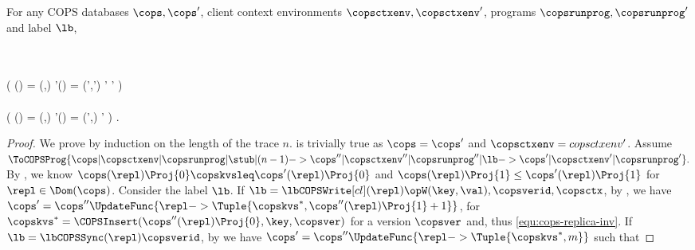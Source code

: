 \begin{toappendix}
\label{sec:proof-monotonic-cops-replca-client}
\begin{proposition}
\label{prop:cops-inv}
For any COPS databases \( \cops, \cops'\), client context environments \( \copsctxenv, \copsctxenv' \),
programs \( \copsrunprog, \copsrunprog' \) and label \( \lb \),
\begin{Formulae}
\begin{Formula}
    \\ \implies {} 
    \\ \left( \cops(\repl) = (\copskvs,\ts) \land
    \cops'(\repl) = (\copskvs',\ts') 
    \implies \copskvs \copskvsleq \copskvs'
    \land \ts \leq \ts'  \right)
    \\ {} \land {} 
    \\ \left( \copsctxenv(\cl) = (\copsctx,\stub) 
    \land  \copsctxenv'(\cl) = (\copsctx',\stub) 
    \implies \copsctx \subseteq  \copsctx' \right) .
\label{equ:cops-replica-inv}
\end{Formula}
\end{Formulae}
\end{proposition}
\begin{proof}
We prove by induction on the length of the trace \( n \).
     is trivially true as \( \cops = \cops' \) and \( \copsctxenv = copsctxenv' \).
    Assume
    \(
        \ToCOPSProg{ \cops | \copsctxenv | \copsrunprog | \stub | (n-1)
        -> \cops'' | \copsctxenv'' | \copsrunprog'' | \lb
        -> \cops' | \copsctxenv' | \copsrunprog' }.
    \)
    By \ih, we know \( \cops(\repl)\Proj{0} \copskvsleq \cops'(\repl)\Proj{0} \) 
    and \( \cops(\repl)\Proj{1} \leq \cops'(\repl)\Proj{1} \)  for \( \repl \in \Dom(\cops) \).
    Consider the label \( \lb \).
    If \( \lb = \lbCOPSWrite[cl](\repl){\opW(\key,\val), \copsverid, \copsctx } \),
    by \rCOPSWrite, we have \( \cops' = \cops''\UpdateFunc{{\repl} -> \Tuple{\copskvs^*, \cops''(\repl)\Proj{1} + 1}}\),
    for \( \copskvs^* = \COPSInsert(\cops''(\repl)\Proj{0},\key,\copsver) \) for a version \( \copsver \)
    and, thus \cref{equ:cops-replica-inv}.
    If \( \lb = \lbCOPSSync(\repl){\copsverid} \),
    by \rCOPSSync we have \( \cops' = \cops''\UpdateFunc{\repl -> \Tuple{\copskvs^*, m } }\) such that

\end{proof}
\end{toappendix}
